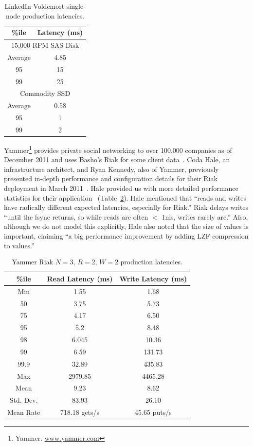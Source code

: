 \documentclass{vldb}
\begin{document}
\begin{table}
\centering
\begin{tabular}{|c|c|}
\hline
\%ile & Latency (ms) \\
\hline
\multicolumn{2}{|c|}{ 15,000 RPM SAS Disk}\\
\hline
Average & 4.85\\
95 & 15\\
99 & 25\\
\hline
\multicolumn{2}{|c|}{ Commodity SSD }\\
\hline
Average & 0.58 \\
95 & 1\\
99 & 2\\
\hline
\end{tabular}
\vspace{-6pt}
\caption{LinkedIn Voldemort single-node production latencies.}
\vspace{-4pt}
\label{table:linkedin}
\end{table}

Yammer\footnote{Yammer. \url{www.yammer.com}} provides private
social networking to over 100,000 companies as of December 2011 and
uses Basho's Riak for some client data~\cite{riak}.  Coda Hale, an
infrastructure architect, and Ryan Kennedy, also of Yammer, previously
presented in-depth performance and configuration details for their
Riak deployment in March 2011~\cite{riakyammer}.  Hale provided us
with more detailed performance statistics for their
application~\cite{codapc} (Table~\ref{table:yammer}).  Hale mentioned
that ``reads and writes have radically different expected latencies,
especially for Riak.''  Riak delays writes ``until the fsync returns,
so while reads are often $<$ 1ms, writes rarely are.''  Also, although
we do not model this explicitly, Hale also noted that the size of
values is important, claiming ``a big performance improvement by
adding LZF compression to values.''

\begin{table}
\centering
\begin{tabular}{|c|c|c|}
\hline
\%ile & Read Latency (ms) & Write Latency (ms)\\
\hline
Min & 1.55 & 1.68\\
50 & 3.75 & 5.73 \\
75 & 4.17 & 6.50\\
95 & 5.2 & 8.48\\
98 & 6.045 & 10.36 \\
99 & 6.59 & 131.73\\
99.9 & 32.89 & 435.83\\
Max & 2979.85 &  4465.28 \\
\hline
Mean & 9.23 & 8.62 \\
Std. Dev. & 83.93 & 26.10\\
\hline
Mean Rate & 718.18 gets/s & 45.65 puts/s\\
\hline
\end{tabular}
\vspace{-4pt}
\caption{Yammer Riak $N$$=$$3$, $R$$=$$2$, $W$$=$$2$ production latencies.}
\vspace{-12pt}
\label{table:yammer}
\end{table}
\end{document}
